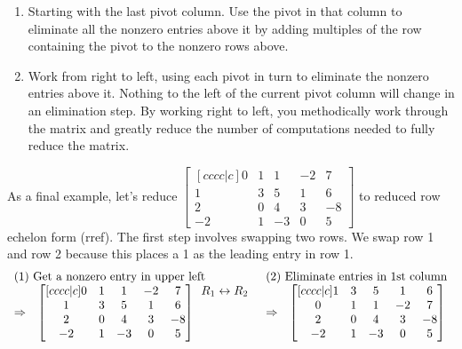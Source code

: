 {\begin{enumerate}
\begin{enumerate}
	\item Starting with the last pivot column. Use the pivot in that column to eliminate all the nonzero entries above it by adding multiples of the row containing the pivot to the nonzero rows above. 
	\item Work from right to left, using each pivot in turn to eliminate the nonzero entries above it. Nothing to the left of the current pivot column will change in an elimination step.  By working right to left, you methodically work through the matrix and greatly reduce the number of computations needed to fully reduce the matrix.
\end{enumerate}
\end{enumerate}


\begin{example}\label{ex rref last}
As a final example, let's reduce 
{\small $
\begin{bmatrix}[cccc|c]
 0 & 1 & 1 & -2 & 7 \\
  1 & 3 & 5 & 1 & 6 \\
 2 & 0 & 4 & 3 & -8 \\
 -2 & 1 & -3 & 0 & 5
\end{bmatrix}
$} to reduced row echelon form (rref). The first step involves swapping two rows. We swap row 1 and row 2 because this places a 1 as the leading entry in row 1.
{\small  $$\begin{array}{rlcl}
\multicolumn{2}{l}{\text{(1) Get a nonzero entry in upper left}}&
\multicolumn{2}{l}{\text{(2) Eliminate entries in 1st column}}\\
\Rightarrow&
\begin{bmatrix}[cccc|c]
 0 & 1 & 1 & -2 & 7 \\
  1 & 3 & 5 & 1 & 6 \\
 2 & 0 & 4 & 3 & -8 \\
 -2 & 1 & -3 & 0 & 5
\end{bmatrix}
  \begin{array}{lr} R_1\leftrightarrow R_2 \\ \ \\ \ \\ \ \end{array}
&\Rightarrow& 
\begin{bmatrix}[cccc|c]
  1 & 3 & 5 & 1 & 6 \\
 0 & 1 & 1 & -2 & 7 \\
 2 & 0 & 4 & 3 & -8 \\
 -2 & 1 & -3 & 0 & 5
\end{bmatrix}

\end{array}$$}
\end{example}}
